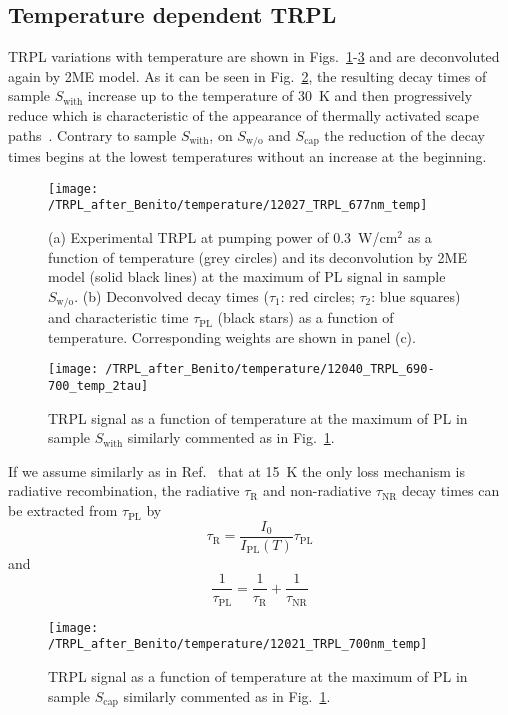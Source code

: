 \subsection{Temperature dependent TRPL}
TRPL variations with temperature are shown in Figs.~\ref{fig:TRPL_temp_wo}-\ref{fig:TRPL_temp_c} and are deconvoluted again by 2ME model. As it can be seen in Fig.~\ref{fig:TRPL_temp_w}, the resulting decay times of sample $S_\mathrm{with}$ increase up to the temperature of 30~K and then progressively reduce which is characteristic of the appearance of thermally activated scape paths~\citep{Manna_apl2012_TRPLtype2}. Contrary to sample $S_\mathrm{with}$, on $S_\mathrm{w/o}$ and $S_\mathrm{cap}$ the reduction of the decay times begins at the lowest temperatures without an increase at the beginning.
%
\begin{figure}
	\centering
	\texttt{[image: /TRPL\_after\_Benito/temperature/12027\_TRPL\_677nm\_temp]}
	\caption{(a) Experimental TRPL at pumping power of 0.3~W/cm$^2$ as a function of temperature (grey circles) and its deconvolution by 2ME model (solid black lines) at the maximum of PL signal in sample $S_\mathrm{w/o}$. (b) Deconvolved decay times ($\tau_1$: red circles; $\tau_2$: blue squares) and characteristic time $\tau_\mathrm{PL}$ (black stars) as a function of temperature. Corresponding weights are shown in panel (c).}
	\label{fig:TRPL_temp_wo}
\end{figure}
%
\begin{figure}
	\centering
	\texttt{[image: /TRPL\_after\_Benito/temperature/12040\_TRPL\_690-700\_temp\_2tau]}
	\caption{TRPL signal as a function of temperature at the maximum of PL in sample $S_\mathrm{with}$ similarly commented as in Fig.~\ref{fig:TRPL_temp_wo}.}
	\label{fig:TRPL_temp_w}
\end{figure}
%

If we assume similarly as in Ref.~\citep{t_alvarez} that at 15~K the only loss mechanism is radiative recombination, the radiative $\tau_\mathrm{R}$ and non-radiative $\tau_\mathrm{NR}$ decay times can be extracted from $\tau_\mathrm{PL}$ by
%
\begin{equation}
\tau_\mathrm{R}=\frac{I_0}{I_\mathrm{PL}(T)}\tau_\mathrm{PL} \label{eq:tau_R_fromPL}
\end{equation}
and
\begin{equation}
\frac{1}{\tau_\mathrm{PL}}=\frac{1}{\tau_\mathrm{R}} + \frac{1}{\tau_\mathrm{NR}}
\end{equation}
%
\begin{figure}
	\centering
	\texttt{[image: /TRPL\_after\_Benito/temperature/12021\_TRPL\_700nm\_temp]}
	\caption{TRPL signal as a function of temperature at the maximum of PL in sample $S_\mathrm{cap}$ similarly commented as in Fig.~\ref{fig:TRPL_temp_wo}.}
	\label{fig:TRPL_temp_c}
\end{figure}
%

